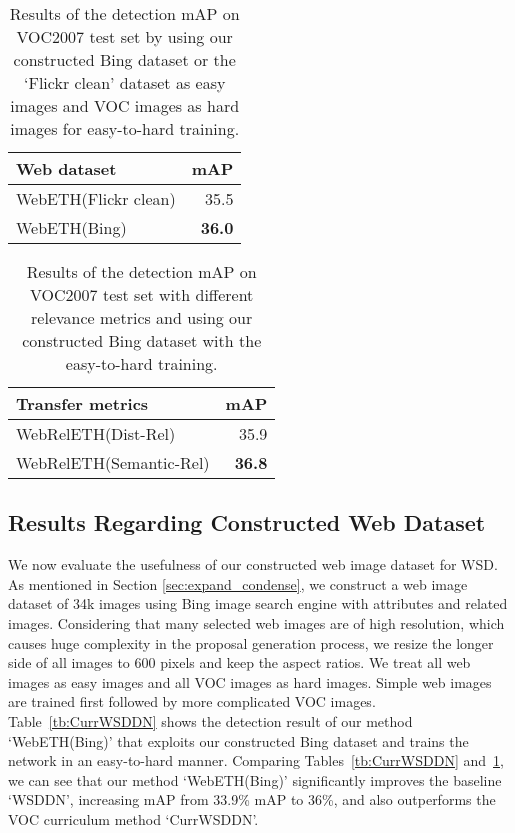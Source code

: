 \documentclass[10pt,twocolumn,letterpaper]{article}
\begin{document}
\begin{table}
\centering
\caption{Results of the detection mAP on VOC2007 test set by using our constructed Bing dataset or the `Flickr clean' dataset as easy images and VOC images as hard images for easy-to-hard training. } \label{tb:WebETH}
\begin{tabular}{| l | r | }
\hline
Web dataset & mAP\\ \hline
\hline
WebETH(Flickr clean)& 35.5 \\ \hline
WebETH(Bing)& \textbf{36.0} \\ \hline
\end{tabular}
\end{table}

\begin{table}
\centering
\caption{Results of the detection mAP on VOC2007 test set with different relevance metrics and using our constructed Bing dataset with the easy-to-hard training. }\label{tb:WebRelETH}
\begin{tabular}{| l | r | }
\hline
Transfer metrics & mAP\\ \hline
\hline
WebRelETH(Dist-Rel)& {35.9} \\ \hline
WebRelETH(Semantic-Rel)& \textbf{36.8} \\ \hline
\end{tabular}
\end{table}

\subsection{Results Regarding Constructed Web Dataset}
We now evaluate the usefulness of our constructed web image dataset for WSD. 
As mentioned in Section \ref{sec:expand_condense}, we construct a web image dataset of 34k images using Bing image search engine with attributes and related images. Considering that many selected web images are of high resolution, which causes huge complexity in the proposal generation process, we resize the longer side of all images to 600 pixels and keep the aspect ratios. 
We treat all web images as easy images and all VOC images as hard images. Simple web images are trained first followed by more complicated VOC images. Table~\ref{tb:CurrWSDDN} shows the detection result of our method `WebETH(Bing)' that exploits our constructed Bing dataset and trains the network in an easy-to-hard manner. Comparing Tables~\ref{tb:CurrWSDDN} and~\ref{tb:WebETH}, we can see that our method `WebETH(Bing)' significantly improves the baseline `WSDDN', increasing mAP from 33.9\% mAP to 36\%, and also outperforms the VOC curriculum method `CurrWSDDN'.
\end{document}
